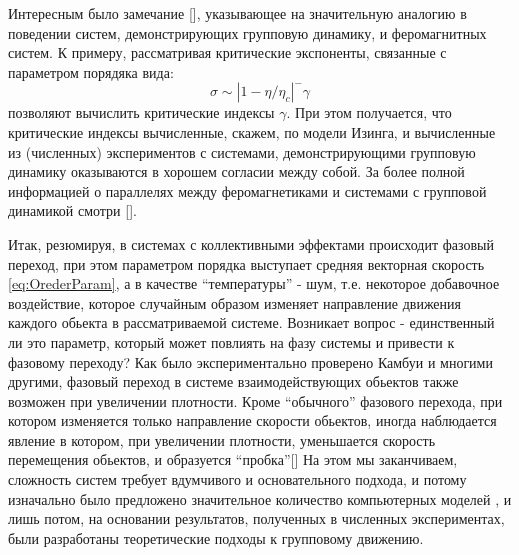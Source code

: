             Интересным было замечание [], указывающее на значительную аналогию в поведении систем, демонстрирующих групповую динамику, и феромагнитных систем. К примеру, рассматривая критические экспоненты, связанные с параметром порядяка вида:
            \begin{equation}
                \sigma \sim |1-\eta/\eta_c|^-\gamma
            \end{equation}
            позволяют вычислить критические индексы $\gamma$. При этом получается, что критические индексы вычисленные, скажем, по модели Изинга, и вычисленные из (численных) экспериментов с системами, демонстрирующими групповую динамику оказываются в хорошем согласии между собой. За более полной информацией о параллелях между феромагнетиками и системами с групповой динамикой смотри [].

            Итак, резюмируя, в системах с коллективными эффектами происходит фазовый переход, при этом параметром порядка выступает средняя векторная скорость \ref{eq:OrederParam}, а в качестве ``температуры'' - шум, т.е. некоторое добавочное воздействие, которое случайным образом изменяет направление движения каждого обьекта в рассматриваемой системе. Возникает вопрос - единственный ли это параметр, который может повлиять на фазу системы и привести к фазовому переходу? Как было экспериментально проверено Камбуи \cite{cambui2012} и многими другими, фазовый переход в системе взаимодействующих обьектов также возможен при увеличении плотности. Кроме ``обычного'' фазового перехода, при котором изменяется только направление скорости обьектов, иногда наблюдается явление в котором, при увеличении плотности, уменьшается скорость перемещения обьектов, и образуется ``пробка''[] 
            На этом мы заканчиваем, сложность систем требует вдумчивого и основательного подхода, и потому изначально было предложено значительное количество компьютерных моделей \cite{reynolds1987,vicsek1995,gregoire2004,nagy2007,schubring2013}, и лишь потом, на основании результатов, полученных в численных экспериментах, были разработаны теоретические подходы к групповому движению. \cite{tu2000,kulinskii2005,bertin2006,ratushnaya2007,vicsek2007,chepizhko2013,kulinskii2014}

